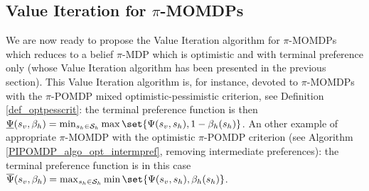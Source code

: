 \subsection{Value Iteration for $\pi$-MOMDPs}
\label{section_VIpiMOMDP}
We are now ready to propose the Value Iteration algorithm for $\pi$-MOMDPs
which reduces to a belief $\pi$-MDP which is optimistic and with terminal preference only
(whose Value Iteration algorithm has been presented in the previous section).
This Value Iteration algorithm is, for instance, devoted to $\pi$-MOMDPs 
with the $\pi$-POMDP mixed optimistic-pessimistic criterion,
see Definition \ref{def_optpesscrit}: the terminal preference function is then
$\underline{\Psi}(s_v,\beta_h) = \min_{s_h \in \mathcal{S}_h} \max \set{ \Psi(s_v,s_h) , 1 - \beta_h(s_h) }$.
An other example of appropriate $\pi$-MOMDP 
with the optimistic $\pi$-POMDP criterion 
(see Algorithm \ref{PIPOMDP_algo_opt_intermpref}, removing intermediate preferences):
the terminal preference function is in this case
$\overline{\Psi}(s_v,\beta_h) = \max_{s_h \in \mathcal{S}_h} \min \set{ \Psi(s_v,s_h) ,\beta_h(s_h) }$.

